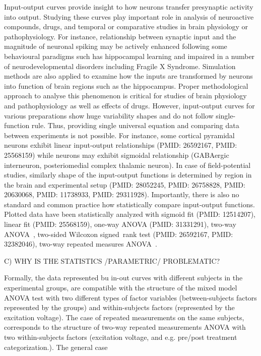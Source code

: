 \documentclass[fleqn,10pt]{wlscirep}
\begin{document}
Input-output curves provide insight to how neurons transfer presynaptic activity into output. Studying these curves play important role in analysis of neuroactive compounds, drugs, and temporal or comparative studies in brain physiology or pathophysiology. For instance, relationship between synaptic input and the magnitude of neuronal spiking may be actively enhanced following some behavioural paradigms such has hippocampal learning\cite{Ohno2006-db} and impaired in a number of neurodevelopmental disorders including Fragile X Syndrome\cite{Booker2021-pd}. Simulation methods are also applied to examine how the inputs are transformed by neurons into function of brain regions such as the hippocampus\cite{Olypher2012-wq, De_Almeida2009-bf}. Proper methodological approach to analyse this phenomenon is critical for studies of brain physiology and pathophysiology as well as effects of drugs. However, input-output curves for various preparations show huge variability shapes and do not follow single-function rule. Thus, providing single universal equation and comparing data between experiments is not possible. For instance, some cortical pyramidal neurons exhibit linear input-output relationships (PMID: 26592167, PMID: 25568159) while neurons may exhibit sigmoidal relationship (GABAergic interneuron\cite{ROTH}, posteriomedial complex thalamic neuron\cite{Landisman}). In case of field-potential studies, similarly shape of the input-output functions is determined by region in the brain and experimental setup (PMID: 28052245, PMID: 26758828, PMID: 20630068, PMID: 11738933, PMID: 29311928). 
Importantly, there is also no standard and common practice how statistically compare input-output functions. Plotted data have been statistically analyzed with sigmoid fit (PMID: 12514207), linear fit (PMID: 25568159), one-way ANOVA (PMID: 31331291), two-way ANOVA~\cite{Klein2014-iz}, two-sided Wilcoxon signed rank test (PMID: 26592167, PMID: 32382046), two-way repeated measures ANOVA~\cite{Chaichim2021-wi}.
  
 
C) WHY IS THE STATISTICS /PARAMETRIC/ PROBLEMATIC?

Formally, the data represented bu in-out curves with different subjects in the experimental groups, are compatible with the structure of the mixed model ANOVA test with two different types of factor variables (between-subjects factors represented by the groups) and within-subjects factors (represented by the excitation voltage). The case of repeated measurements on the same subjects,  corresponds to the structure of two-way repeated measurements ANOVA with two within-subjects factors (excitation voltage, and e.g. pre/post treatment categorization.). The general case 
\end{document}
